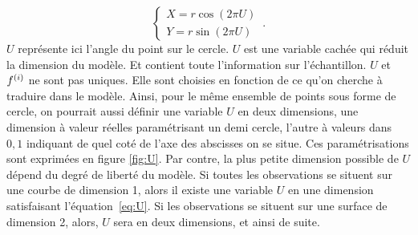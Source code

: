 $$
 \begin{cases}
     X = r  \cos(2\pi U)\\
     Y = r \sin(2 \pi U)
    \end{cases}\,.
$$
$U$ représente ici l'angle du point sur le cercle. $U$ est une variable cachée qui réduit la dimension du modèle. Et contient toute l'information sur l'échantillon. 
$U$ et $f^{({i})}$ ne sont pas uniques. Elle sont choisies en fonction de ce qu'on cherche à traduire dans le modèle. Ainsi, pour le même ensemble de points sous forme de cercle, on pourrait aussi définir une variable $U$ en deux dimensions, une dimension à valeur réelles paramétrisant un demi cercle, l'autre à valeurs dans ${0,1}$ indiquant de quel coté de l'axe des abscisses on se situe. Ces paramétrisations sont exprimées en figure \ref{fig:U}.
Par contre, la plus petite dimension possible de $U$ dépend du degré de liberté du modèle. Si toutes les observations se situent sur une courbe de dimension 1, alors il existe une variable $U$ en une dimension satisfaisant l'équation~\ref{eq:U}. Si les observations se situent sur une surface de dimension 2, alors, $U$ sera en deux dimensions, et ainsi de suite. 

